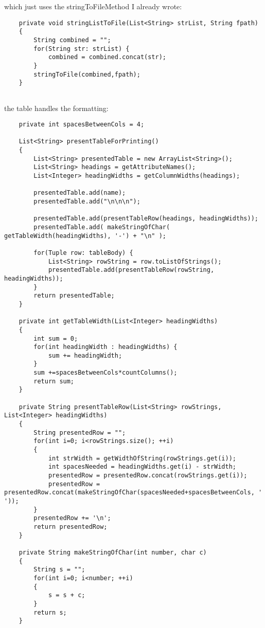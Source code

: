 \documentclass[11pt]{article} %
\begin{document}
which just uses the stringToFileMethod I already wrote:

\begin{lstlisting}
    private void stringListToFile(List<String> strList, String fpath)
    {
        String combined = "";
        for(String str: strList) {
            combined = combined.concat(str);
        }
        stringToFile(combined,fpath);
    }
    
\end{lstlisting}

the table handles the formatting:

\begin{lstlisting}
    private int spacesBetweenCols = 4;

    List<String> presentTableForPrinting()
    {
        List<String> presentedTable = new ArrayList<String>();
        List<String> headings = getAttributeNames();
        List<Integer> headingWidths = getColumnWidths(headings);
        
        presentedTable.add(name);
        presentedTable.add("\n\n\n");
        
        presentedTable.add(presentTableRow(headings, headingWidths));
        presentedTable.add( makeStringOfChar( getTableWidth(headingWidths), '-') + "\n" );
        
        for(Tuple row: tableBody) {
            List<String> rowString = row.toListOfStrings();
            presentedTable.add(presentTableRow(rowString, headingWidths));
        }
        return presentedTable;
    }
    
    private int getTableWidth(List<Integer> headingWidths)
    {
        int sum = 0;
        for(int headingWidth : headingWidths) {
            sum += headingWidth;
        }
        sum +=spacesBetweenCols*countColumns();
        return sum;
    }
    
    private String presentTableRow(List<String> rowStrings, List<Integer> headingWidths)
    {
        String presentedRow = "";
        for(int i=0; i<rowStrings.size(); ++i)
        {
            int strWidth = getWidthOfString(rowStrings.get(i));
            int spacesNeeded = headingWidths.get(i) - strWidth;
            presentedRow = presentedRow.concat(rowStrings.get(i));
            presentedRow = presentedRow.concat(makeStringOfChar(spacesNeeded+spacesBetweenCols, ' '));
        }
        presentedRow += '\n';
        return presentedRow;
    }
    
    private String makeStringOfChar(int number, char c)
    {
        String s = "";
        for(int i=0; i<number; ++i)
        {
            s = s + c;
        }
        return s;
    }
    

\end{lstlisting}
\end{document}
